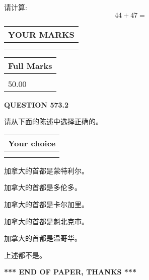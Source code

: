 \documentclass{ctexart}
\begin{document}
  
 
请计算:
\begin{equation}
44 +  %
47 = \nonumber
\end{equation}
 

 

 
  
\vspace{0.2in}
  
\noindent\begin{tabular}{|l|}
\hline
 YOUR MARKS  \\
\hline
 \\ 
 \\ 
\hline
\end{tabular}
\hspace{0.05in} \begin{tabular}{|l|}
\hline
 Full Marks  \\
\hline
 \\ 
50.00 \\
\hline
\end{tabular}
{\textbf{\Large{QUESTION
573.2 
}}}
  
  
请从下面的陈述中选择正确的。
  
  
\noindent\hspace{3.0in} \begin{tabular}{|l|}
\hline
Your choice \\
\hline
 \\ 
 \\ 
\hline
\end{tabular}
  
  
 
 
加拿大的首都是蒙特利尔。
 
 
加拿大的首都是多伦多。
 
 
加拿大的首都是卡尔加里。
 
 
加拿大的首都是魁北克市。
 
 
加拿大的首都是温哥华。
 
 
 上述都不是。
 
 
   
   
 \vspace{0.2in}
 
   
   
   
   
\vspace{1.0in} 
{\textbf{\large{ *** END OF PAPER, THANKS *** }}} 
   
\end{document}

